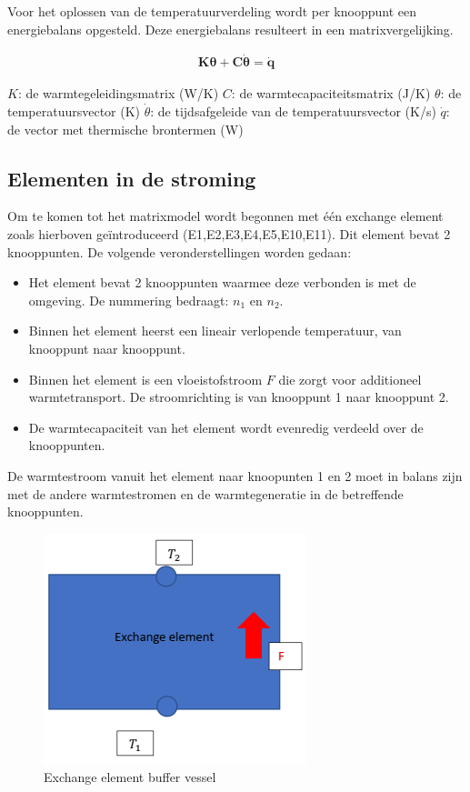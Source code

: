 Voor het oplossen van de temperatuurverdeling wordt per knooppunt een energiebalans opgesteld.
Deze energiebalans resulteert in een matrixvergelijking.

\begin{equation}
	\begin{aligned}
	    \mathbf{K \theta + C \dot{\theta}} = \mathbf{\dot{q}}	    	
	\end{aligned}
\end{equation}

$K$: de warmtegeleidingsmatrix (W/K)
$C$: de warmtecapaciteitsmatrix (J/K)
$\theta$: de temperatuursvector (K)
$\dot{\theta}$: de tijdsafgeleide van de temperatuursvector (K/s)
$\dot{q}$: de vector met thermische brontermen (W)

\subsection{Elementen in de stroming}

Om te komen tot het matrixmodel wordt begonnen met één exchange element zoals hierboven
geïntroduceerd (E1,E2,E3,E4,E5,E10,E11). Dit element bevat 2 knooppunten. De volgende veronderstellingen worden gedaan:

\begin{itemize}
	\item Het element bevat 2 knooppunten waarmee deze verbonden is met de omgeving. De
	nummering bedraagt: $n_1$ en $n_2$.
	\item Binnen het element heerst een lineair verlopende temperatuur, van knooppunt naar
	knooppunt.
	\item Binnen het element is een vloeistofstroom $F$ die zorgt voor additioneel warmtetransport. De stroomrichting is van knooppunt 1 naar knooppunt 2.
	\item De warmtecapaciteit van het element wordt evenredig verdeeld over de knooppunten.
\end{itemize}

De warmtestroom vanuit het element naar knoopunten 1 en 2 moet in balans zijn met de andere
warmtestromen en de warmtegeneratie in de betreffende knooppunten.

\begin{figure}[H]
	\centering
	\includegraphics[width=0.7\columnwidth]{Figures/exchange_element.png}
	\caption[Short title]{Exchange element buffer vessel}
	\label{fig:exchange_element}
\end{figure}

